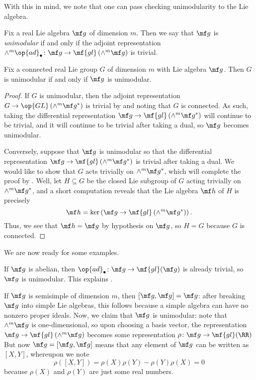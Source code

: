 \documentclass{amsart}
\begin{document}
With this in mind, we note that one can pass checking unimodularity to the Lie algebra.
\begin{definition}[unimodular]
	Fix a real Lie algebra $\mf g$ of dimension $m$. Then we say that $\mf g$ is \textit{unimodular} if and only if the adjoint representation $\land^m\op{ad}_\bullet\colon\mf g\to\mf{gl}\left(\land^m\mf g\right)$ is trivial.
\end{definition}
\begin{proposition}
	Fix a connected real Lie group $G$ of dimension $m$ with Lie algebra $\mf g$. Then $G$ is unimodular if and only if $\mf g$ is unimodular.
\end{proposition}
\begin{proof}
	If $G$ is unimodular, then the adjoint representation $G\to\op{GL}\left(\land^m\mf g^*\right)$ is trivial by  and noting that $G$ is connected. As such, taking the differential representation $\mf g\to\mf{gl}\left(\land^m\mf g^*\right)$ will continue to be trivial, and it will continue to be trivial after taking a dual, so $\mf g$ becomes unimodular.

	Conversely, suppose that $\mf g$ is unimodular so that the differential representation $\mf g\to\mf{gl}\left(\land^m\mf g^*\right)$ is trivial after taking a dual. We would like to show that $G$ acts trivially on $\land^m\mf g^*$, which will complete the proof by . Well, let $H\subseteq G$ be the closed Lie subgroup of $G$ acting trivially on $\land^m\mf g^*$, and a short computation reveals that the Lie algebra $\mf h$ of $H$ is precisely
	\[\mf h=\ker\left(\mf g\to\mf{gl}\left(\land^m\mf g^*\right)\right).\]
	Thus, we see that $\mf h=\mf g$ by hypothesis on $\mf g$, so $H=G$ because $G$ is connected.
\end{proof}
We are now ready for some examples.
\begin{example}
	If $\mf g$ is abelian, then $\op{ad}_\bullet\colon\mf g\to\mf{gl}(\mf g)$ is already trivial, so $\mf g$ is unimodular. This explains .
\end{example}
\begin{example} \label{ex:ss-is-unimodular}
	If $\mf g$ is semisimple of dimension $m$, then $[\mf g,\mf g]=\mf g$: after breaking $\mf g$ into simple Lie algebras, this follows because a simple algebra can have no nonzero proper ideals. Now, we claim that $\mf g$ is unimodular: note that $\land^m\mf g$ is one-dimensional, so upon choosing a basis vector, the representation $\mf g\to\mf{gl}\left(\land^m\mf g\right)$ becomes some representation $\rho\colon\mf g\to\mf{gl}(\RR)$ But now $\mf g=[\mf g,\mf g]$ means that any element of $\mf g$ can be written as $[X,Y]$, whereupon we note
	\[\rho([X,Y])=\rho(X)\rho(Y)-\rho(Y)\rho(X)=0\]
	because $\rho(X)$ and $\rho(Y)$ are just some real numbers.
\end{example}
\end{document}
